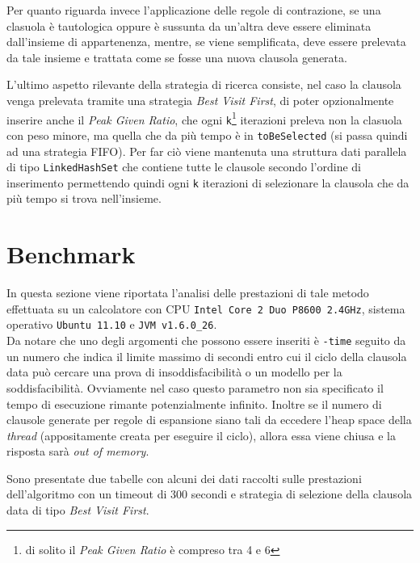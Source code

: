 \documentclass[a4paper,11pt]{article}
\begin{document}
Per quanto riguarda invece l'applicazione delle regole di contrazione, se una clasuola è tautologica oppure è sussunta da un'altra deve essere eliminata dall'insieme di appartenenza, mentre, se viene semplificata, deve essere prelevata da tale insieme e trattata come se fosse una nuova clausola generata.\par
L'ultimo aspetto rilevante della strategia di ricerca consiste, nel caso la clausola venga prelevata tramite una strategia \emph{Best Visit First}, di poter opzionalmente inserire anche il \emph{Peak Given Ratio}, che ogni \texttt{k}\footnote{di solito il \emph{Peak Given Ratio} è compreso tra 4 e 6} iterazioni preleva non la clasuola con peso minore, ma quella che da più tempo è in \texttt{toBeSelected} (si passa quindi ad una strategia FIFO). Per far ciò viene mantenuta una struttura dati parallela di tipo \texttt{LinkedHashSet} che contiene tutte le clausole secondo l'ordine di inserimento permettendo quindi ogni \texttt{k} iterazioni di selezionare la clausola che da più tempo si trova nell'insieme.

\section{Benchmark}
In questa sezione viene riportata l'analisi delle prestazioni di tale metodo effettuata su un calcolatore con CPU \texttt{Intel Core 2 Duo P8600 2.4GHz}, sistema operativo \texttt{Ubuntu 11.10} e \texttt{JVM v1.6.0\_26}.\\
Da notare che uno degli argomenti che possono essere inseriti è \texttt{-time} seguito da un numero che indica il limite massimo di secondi entro cui il ciclo della clausola data può cercare una prova di insoddisfacibilità o un modello per la soddisfacibilità. Ovviamente nel caso questo parametro non sia specificato il tempo di esecuzione rimante potenzialmente infinito. Inoltre se il numero di clausole generate per regole di espansione siano tali da eccedere l'heap space della \emph{thread} (appositamente creata per eseguire il ciclo), allora essa viene chiusa e la risposta sarà \emph{out of memory}.\par
Sono presentate due tabelle con alcuni dei dati raccolti sulle prestazioni dell'algoritmo con un timeout di 300 secondi e  strategia di selezione della clausola data di tipo \emph{Best Visit First}.
\end{document}
